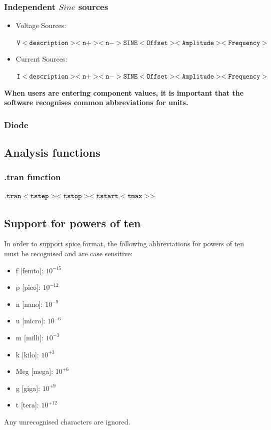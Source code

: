 \documentclass[a4paper, titlepage]{article}
\begin{document}
    \subsubsection{Independent $Sine$ sources}
    \begin{itemize}
        \item Voltage Sources: 
        \begin{center}
            $\tt V<description> <n+> <n->SINE<Offset><Amplitude><Frequency>$
        \end{center}
        \item Current Sources:
        \begin{center}
            $\tt I<description> <n+> <n->SINE<Offset><Amplitude><Frequency>$
        \end{center}
    \end{itemize}
    \textbf {When users are entering component values, it is important that the software recognises common abbreviations 
    for units.}
    \subsubsection{Diode}
    \subsection{Analysis functions}
    \subsubsection{.tran function}
    \begin{center}
        $\tt .tran <tstep><tstop> <tstart <tmax>>$
    \end{center}


    \pagebreak
    \subsection{Support for powers of ten}
    In order to support {\selectfont spice} format, the following abbreviations for powers of ten 
    must be recognised and are case sensitive:
    \begin{multicols}{2}
    \begin{itemize}
        \item f [femto]: $ 10^{-15} $
        \item p [pico]: $ 10^{-12} $
        \item n [nano]: $ 10^{-9} $
        \item u [micro]: $ 10^{-6} $
        \item m [milli]: $ 10^{-3} $
        \item k [kilo]: $ 10^{+3} $
        \item Meg [mega]: $ 10^{+6} $
        \item g [giga]: $ 10^{+9} $
        \item t [tera]: $ 10^{+12} $
    \end{itemize}
    \end{multicols}
    Any unrecognised characters are ignored.
    
\end{document}
